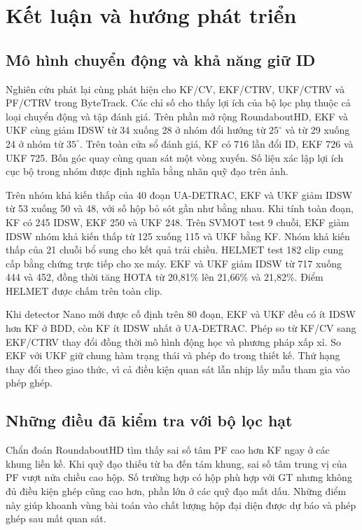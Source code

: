 \chapter{Kết luận và hướng phát triển}
\section{Mô hình chuyển động và khả năng giữ ID}
Nghiên cứu phát lại cùng phát hiện cho KF/CV, EKF/CTRV, UKF/CTRV và PF/CTRV trong ByteTrack. Các chỉ số cho thấy lợi ích của bộ lọc phụ thuộc cả loại chuyển động và tập đánh giá. Trên phần mở rộng RoundaboutHD, EKF và UKF cùng giảm IDSW từ 34 xuống 28 ở nhóm đổi hướng từ $25^\circ$ và từ 29 xuống 24 ở nhóm từ $35^\circ$. Trên toàn cửa sổ đánh giá, KF có 716 lần đổi ID, EKF 726 và UKF 725. Bốn góc quay cùng quan sát một vòng xuyến. Số liệu xác lập lợi ích cục bộ trong nhóm được định nghĩa bằng nhãn quỹ đạo trên ảnh.

Trên nhóm khả kiến thấp của 40 đoạn UA-DETRAC, EKF và UKF giảm IDSW từ 53 xuống 50 và 48, với số hộp bỏ sót gần như bằng nhau. Khi tính toàn đoạn, KF có 245 IDSW, EKF 250 và UKF 248. Trên SVMOT test 9 chuỗi, EKF giảm IDSW nhóm khả kiến thấp từ 125 xuống 115 và UKF bằng KF. Nhóm khả kiến thấp của 21 chuỗi bổ sung cho kết quả trái chiều. HELMET test 182 clip cung cấp bằng chứng trực tiếp cho xe máy. EKF và UKF giảm IDSW từ 717 xuống 444 và 452, đồng thời tăng HOTA từ 20,81\% lên 21,66\% và 21,82\%. Điểm HELMET được chấm trên toàn clip.

Khi detector Nano mới được cố định trên 80 đoạn, EKF và UKF đều có ít IDSW hơn KF ở BDD, còn KF ít IDSW nhất ở UA-DETRAC. Phép so từ KF/CV sang EKF/CTRV thay đổi đồng thời mô hình động học và phương pháp xấp xỉ. So EKF với UKF giữ chung hàm trạng thái và phép đo trong thiết kế. Thứ hạng thay đổi theo giao thức, vì cả điều kiện quan sát lẫn nhịp lấy mẫu tham gia vào phép ghép.

\section{Những điều đã kiểm tra với bộ lọc hạt}
Chẩn đoán RoundaboutHD tìm thấy sai số tâm PF cao hơn KF ngay ở các khung liền kề. Khi quỹ đạo thiếu từ ba đến tám khung, sai số tâm trung vị của PF vượt nửa chiều cao hộp. Số trường hợp có hộp phù hợp với GT nhưng không đủ điều kiện ghép cũng cao hơn, phần lớn ở các quỹ đạo mất dấu. Những điểm này giúp khoanh vùng bài toán vào chất lượng hộp đại diện được dự báo và phép ghép sau mất quan sát.

